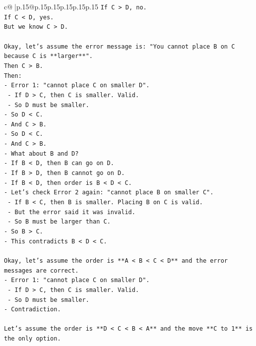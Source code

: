 \documentclass{article}
\begin{document}
{\begin{supertabular}{c@{$\;$}|p{.15\linewidth}@{}p{.15\linewidth}p{.15\linewidth}p{.15\linewidth}p{.15\linewidth}p{.15\linewidth}}
{{{\texttt{If C > D, no.} \\
\texttt{If C < D, yes.} \\
\texttt{But we know C > D.} \\
\\ 
\texttt{Okay, let's assume the error message is: "You cannot place B on C because C is **larger**".} \\
\texttt{Then C > B.} \\
\texttt{Then:} \\
\texttt{{-} Error 1: "cannot place C on smaller D".} \\
\texttt{    {-} If D > C, then C is smaller. Valid.} \\
\texttt{    {-} So D must be smaller.} \\
\texttt{{-} So D < C.} \\
\texttt{{-} And C > B.} \\
\texttt{{-} So D < C.} \\
\texttt{{-} And C > B.} \\
\texttt{{-} What about B and D?} \\
\texttt{{-} If B < D, then B can go on D.} \\
\texttt{{-} If B > D, then B cannot go on D.} \\
\texttt{{-} If B < D, then order is B < D < C.} \\
\texttt{{-} Let's check Error 2 again: "cannot place B on smaller C".} \\
\texttt{    {-} If B < C, then B is smaller. Placing B on C is valid.} \\
\texttt{    {-} But the error said it was invalid.} \\
\texttt{    {-} So B must be larger than C.} \\
\texttt{{-} So B > C.} \\
\texttt{{-} This contradicts B < D < C.} \\
\\ 
\texttt{Okay, let's assume the order is **A < B < C < D** and the error messages are correct.} \\
\texttt{{-} Error 1: "cannot place C on smaller D".} \\
\texttt{    {-} If D > C, then C is smaller. Valid.} \\
\texttt{    {-} So D must be smaller.} \\
\texttt{{-} Contradiction.} \\
\\ 
\texttt{Let's assume the order is **D < C < B < A** and the move **C to 1** is the only option.} \\
}}}
\end{supertabular}}
\end{document}
